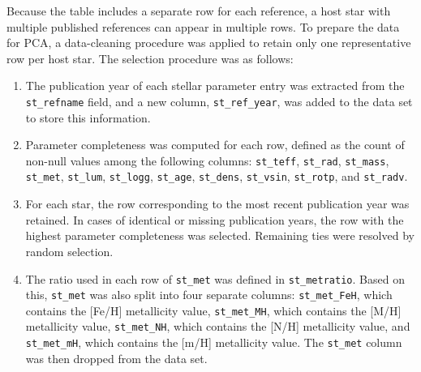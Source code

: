 \documentclass[preprint,longauthor,twocolumn]{aastex631}
\begin{document}
Because the table includes a separate row for each reference, a host star with multiple published references can appear in multiple rows. To prepare the data for PCA, a data-cleaning procedure was applied to retain only one representative row per host star. The selection procedure was as follows:
\begin{enumerate}
  \item The publication year of each stellar parameter entry was extracted from the \verb|st_refname| field, and a new column, \verb|st_ref_year|, was added to the data set to store this information.

  \item Parameter completeness was computed for each row, defined as the count of non-null values among the following columns: \verb|st_teff|, \verb|st_rad|, \verb|st_mass|, \verb|st_met|, \verb|st_lum|, \verb|st_logg|, \verb|st_age|, \verb|st_dens|, \verb|st_vsin|, \verb|st_rotp|, and \verb|st_radv|.

  \item For each star, the row corresponding to the most recent publication year was retained. In cases of identical or missing publication years, the row with the highest parameter completeness was selected. Remaining ties were resolved by random selection.
  
  \item The ratio used in each row of \verb|st_met| was defined in \verb|st_metratio|. Based on this, \verb|st_met| was also split into four separate columns: \verb|st_met_FeH|, which contains the [Fe/H] metallicity value, \verb|st_met_MH|, which contains the [M/H] metallicity value, \verb|st_met_NH|, which contains the [N/H] metallicity value, and \verb|st_met_mH|, which contains the [m/H] metallicity value. The \verb|st_met| column was then dropped from the data set.
\end{enumerate}
\end{document}
